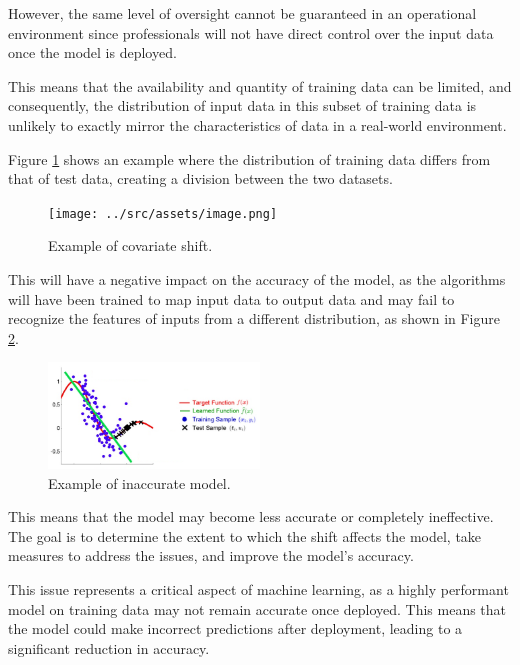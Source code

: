 However, the same level of oversight cannot be guaranteed in an operational environment since professionals will not have direct control over the input data once the model is deployed.  

This means that the availability and quantity of training data can be limited, and consequently, the distribution of input data in this subset of training data is unlikely to exactly mirror the characteristics of data in a real-world environment.

Figure \ref{covariate-shift} shows an example where the distribution of training data differs from that of test data, creating a division between the two datasets.  

\vspace{0.5cm}  
\begin{figure}[h!]
    \centering
    \texttt{[image: ../src/assets/image.png]} 
    \caption{Example of covariate shift.}
    \label{covariate-shift}
\end{figure}

This will have a negative impact on the accuracy of the model, as the algorithms will have been trained to map input data to output data and may fail to recognize the features of inputs from a different distribution, as shown in Figure \cref{inaccurate-model}.  

\begin{figure}[h!]
    \centering
    \includegraphics[width=0.5\textwidth]{../src/assets/covariate_shift.png} 
    \caption{Example of inaccurate model.}
    \label{inaccurate-model}
\end{figure}  

This means that the model may become less accurate or completely ineffective. The goal is to determine the extent to which the shift affects the model, take measures to address the issues, and improve the model's accuracy.

This issue represents a critical aspect of machine learning, as a highly performant model on training data may not remain accurate once deployed. This means that the model could make incorrect predictions after deployment, leading to a significant reduction in accuracy.

